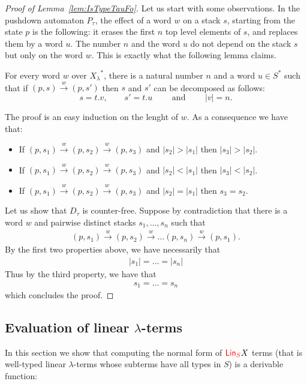 \begin{proof}[Proof of Lemma~\ref{lem:IsTypeTauFo}]
Let us start with some observations. In the pushdown automaton $P_\tau$, the effect of a word $w$ on a stack $s$, starting from the state $p$ is the following: it erases the first $n$ top level elements of $s$, and replaces them by a word $u$. The number $n$ and the word $u$ do not depend on the stack $s$ but only on the word $w$. This is exactly what the following lemma claims.

\begin{lemma}
For every word $w$ over ${X_\lambda}^*$, there is a natural number $n$ and a word $u\in S^*$ such that if $(p,s)\xrightarrow{w}(p,s')$ then $s$ and $s'$ can be decomposed as follows:
$$s=t.v,\qquad s'=t.u\qquad \text{ and }\qquad |v|=n.$$
\end{lemma}
The proof is an easy induction on the lenght of $w$. As a consequence we have that:
\begin{itemize}
\item If $(p,s_1)\xrightarrow{w}(p,s_2)\xrightarrow{w}(p,s_3)$ and $|s_2|>|s_1|$ then $|s_3|>|s_2|$.
\item If $(p,s_1)\xrightarrow{w}(p,s_2)\xrightarrow{w}(p,s_3)$ and $|s_2|<|s_1|$ then $|s_3|<|s_2|$.
\item If $(p,s_1)\xrightarrow{w}(p,s_2)\xrightarrow{w}(p,s_3)$ and $|s_2|=|s_1|$ then $s_3 =s_2$.
\end{itemize}

Let us show that $D_\tau$ is counter-free. Suppose by contradiction that there is a word $w$ and pairwise distinct stacks $s_1,\dots, s_n$ such that 
\begin{align*}
(p,s_1)\xrightarrow{w}(p,s_2)\xrightarrow{w}\dots(p,s_n)\xrightarrow{w}(p,s_1).
\end{align*} 
By the first two properties above, we have necessarily that 
\begin{align*}
|s_1|=\dots=|s_n|
\end{align*}
 Thus by the third property, we have that 
\begin{align*}
 s_1=\dots=s_n
\end{align*} 
 which concludes the proof.
\end{proof}



\subsection{Evaluation of linear $\lambda$-terms}

In this section we show that computing the normal form of ${\color{red}{\mathsf{Lin}_{S}}} X$ terms (that is well-typed linear $\lambda$-terms whose subterms have all types in $S$) is a derivable function:

